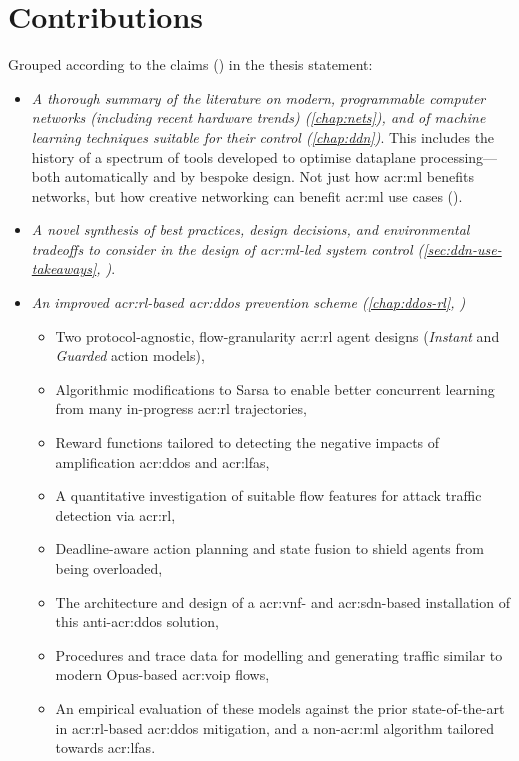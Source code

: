 \section{Contributions}
Grouped according to the claims () in the thesis statement:
\begin{itemize}
	\item \emph{A thorough summary of the literature on modern, programmable computer networks (including recent hardware trends) (\cref{chap:nets}), and of machine learning techniques suitable for their control (\cref{chap:ddn})}. This includes the history of a spectrum of tools developed to optimise dataplane processing---both automatically and by bespoke design. Not just how \gls{acr:ml} benefits networks, but how creative networking can benefit \gls{acr:ml} use cases ().
	\item \emph{A novel synthesis of best practices, design decisions, and environmental tradeoffs to consider in the design of \gls{acr:ml}-led system control (\cref{sec:ddn-use-takeaways}, )}.
	\item \emph{An improved \gls{acr:rl}-based \gls{acr:ddos} prevention scheme (\cref{chap:ddos-rl}, )}
	\begin{itemize}
		\item Two protocol-agnostic, flow-granularity \gls{acr:rl} agent designs (\emph{Instant} and \emph{Guarded} action models),
		\item Algorithmic modifications to Sarsa to enable better concurrent learning from many in-progress \gls{acr:rl} trajectories,
		\item Reward functions tailored to detecting the negative impacts of amplification \gls{acr:ddos} and \glspl{acr:lfa},
		\item A quantitative investigation of suitable flow features for attack traffic detection via \gls{acr:rl},
		\item Deadline-aware action planning and state fusion to shield agents from being overloaded,
		\item The architecture and design of a \gls{acr:vnf}- and \gls{acr:sdn}-based installation of this anti-\gls{acr:ddos} solution,
		\item Procedures and trace data for modelling and generating traffic similar to modern Opus-based \gls{acr:voip} flows,
		\item An empirical evaluation of these models against the prior state-of-the-art in \gls{acr:rl}-based \gls{acr:ddos} mitigation, and a  non-\gls{acr:ml} algorithm tailored towards \glspl{acr:lfa}.

\end{itemize}
\end{itemize}
